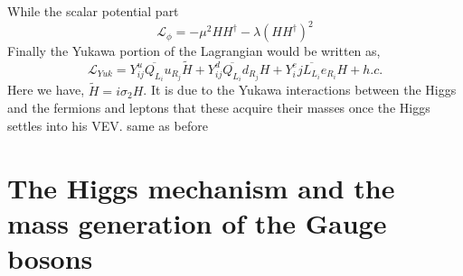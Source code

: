%
While the scalar potential part 
%
\begin{equation}
\mathcal{L}_{\phi} = -\mu^2 H H^\dagger - \lambda (H H^\dagger)^2
\end{equation}
Finally the Yukawa portion of the Lagrangian would be written as, 
\begin{equation}
\label{eq:YukawaSM}
\mathcal{L}_{Yuk} = Y^u_{ij} \overline{Q_{L_i}} u_{R_j}  \tilde{H} + Y^d_{ij} \overline{Q_{L_i}}  d_{R_j} H  + Y^e_ij \overline{L_{L_i}}  e_{R_i} H + h.c. 
\end{equation}
%
Here we have, $\tilde{H}=i\sigma_2 H$.
%
{ \color{gray} It is due to the Yukawa interactions between the Higgs and the fermions and leptons that these acquire their masses once the Higgs settles into his VEV. } { \color{blue} same as before }

\section{The Higgs mechanism and the mass generation of the Gauge bosons}




